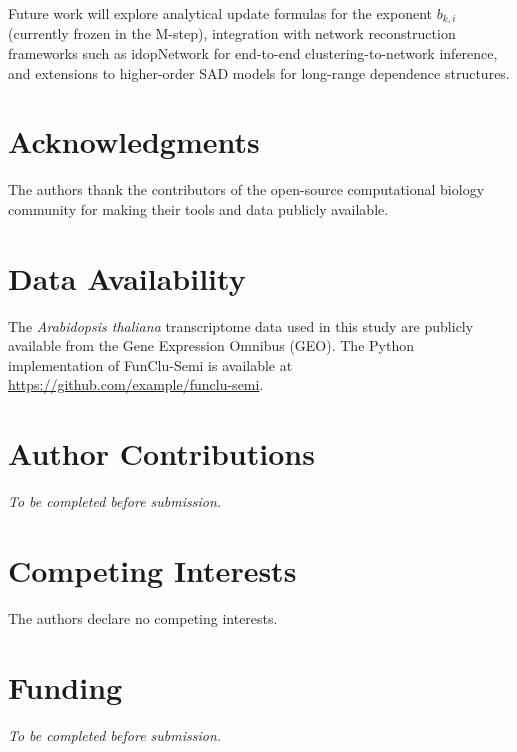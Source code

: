 \documentclass[12pt,a4paper]{article}
\begin{document}
Future work will explore analytical update formulas for the exponent $b_{k,i}$ (currently frozen in the M-step), integration with network reconstruction frameworks such as idopNetwork \cite{dong2023idopnetwork} for end-to-end clustering-to-network inference, and extensions to higher-order SAD models for long-range dependence structures.

\section*{Acknowledgments}

The authors thank the contributors of the open-source computational biology community for making their tools and data publicly available.

\section*{Data Availability}

The \textit{Arabidopsis thaliana} transcriptome data used in this study are publicly available from the Gene Expression Omnibus (GEO). The Python implementation of FunClu-Semi is available at \url{https://github.com/example/funclu-semi}.

\section*{Author Contributions}

{\em To be completed before submission.}

\section*{Competing Interests}

The authors declare no competing interests.

\section*{Funding}

{\em To be completed before submission.}
\end{document}
